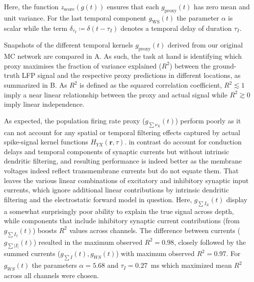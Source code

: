 %
Here, the function $z_\text{score}(g(t))$ ensures that each $g_\text{proxy}(t)$ has zero mean and unit variance. 
For the last temporal component $g_\text{WS}(t)$ the parameter $\alpha$ is scalar 
while the term $\delta_{\tau_I} \coloneq \delta(t-\tau_I)$ denotes a temporal delay of duration $\tau_I$.

Snapshots of the different temporal kernels $g_\text{proxy}(t)$ derived from our original MC network are compared in A.  
As such, the task at hand is identifying which proxy maximises the fraction of variance explained ($R^2$) between the  ground-truth LFP signal and the respective proxy predictions in different locations, 
as summarized in B. 
As $R^2$ is defined as the squared correlation coefficient, $R^2 \lesssim 1$ imply a near linear relationship between the proxy and actual signal while $R^2 \gtrsim 0$ imply linear independence.

As expected, the population firing rate proxy ($g_{\sum \nu_X}(t)$) perform poorly as it can not account for any spatial or temporal filtering effects captured by actual spike-signal kernel functions $H_{YX}(\mathbf{r}, \tau)$. 
 in contrast do account for conduction delays and
temporal components of synaptic currents but without intrinsic dendritic filtering, 
and resulting performance is indeed better as the membrane voltages indeed reflect transmembrane currents but do not equate them. 
That leaves the various linear combinations of excitatory and inhibitory synaptic input currents, 
which ignore additional linear contributions by intrinsic dendritic filtering and the electrostatic forward model in question. 
Here, $g_{\sum I_E}(t)$ display a somewhat surprisingly poor ability to explain the true signal across depth, 
while components that include inhibitory synaptic current contributions (from $g_{\sum I_I}(t)$) boosts $R^2$ values across channels. 
The difference between currents ($g_{\sum {|I|}}(t)$) resulted in the maximum observed $R^2 = 0.98$, 
closely followed by the summed currents ($g_{\sum {I}}(t), g_{WS}(t)$) with maximum observed $R^2 = 0.97$.
For $g_{WS}(t)$ the parameters $\alpha=5.68$ and $\tau_I=0.27$~\si{\milli\second} which maximized mean $R^2$ across all channels were chosen.

